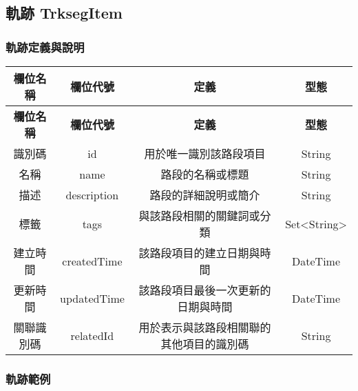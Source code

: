\subsection{軌跡 TrksegItem}

\subsubsection{軌跡定義與說明}

\begin{longtable}{|c|c|c|c|}
  \hline
  \textbf{欄位名稱} & \textbf{欄位代號} & \textbf{定義} & \textbf{型態} \\
  \hline
  \endfirsthead
  \hline
  \textbf{欄位名稱} & \textbf{欄位代號} & \textbf{定義} & \textbf{型態} \\
  \hline
  \endhead
  
  識別碼 & id & 用於唯一識別該路段項目 & String \\
  \hline
  名稱 & name & 路段的名稱或標題 & String \\
  \hline
  描述 & description & 路段的詳細說明或簡介 & String \\
  \hline
  標籤 & tags & 與該路段相關的關鍵詞或分類 & Set<String> \\
  \hline
  建立時間 & createdTime & 該路段項目的建立日期與時間 & DateTime \\
  \hline
  更新時間 & updatedTime & 該路段項目最後一次更新的日期與時間 & DateTime \\
  \hline
  關聯識別碼 & relatedId & 用於表示與該路段相關聯的其他項目的識別碼 & String \\
  \hline
\end{longtable}

\subsubsection{軌跡範例}